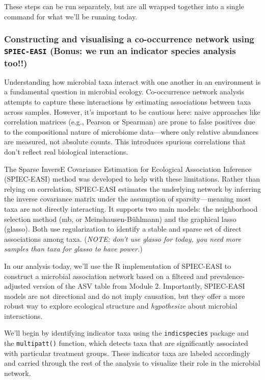 \documentclass[
]{book}
\begin{document}
These steps can be run separately, but are all wrapped together into a single command for what we'll be running today.

\subsubsection{\texorpdfstring{Constructing and visualising a co-occurrence network using \texttt{SPIEC-EASI} (Bonus: we run an indicator species analysis too!!)}{Constructing and visualising a co-occurrence network using SPIEC-EASI (Bonus: we run an indicator species analysis too!!)}}\label{constructing-and-visualising-a-co-occurrence-network-using-spiec-easi-bonus-we-run-an-indicator-species-analysis-too}

Understanding how microbial taxa interact with one another in an environment is a fundamental question in microbial ecology. Co-occurrence network analysis attempts to capture these interactions by estimating associations between taxa across samples. However, it's important to be cautious here: naive approaches like correlation matrices (e.g., Pearson or Spearman) are prone to false positives due to the compositional nature of microbiome data---where only relative abundances are measured, not absolute counts. This introduces spurious correlations that don't reflect real biological interactions.

The Sparse InversE Covariance Estimation for Ecological Association Inference (SPIEC-EASI) method was developed to help with these limitations. Rather than relying on correlation, SPIEC-EASI estimates the underlying network by inferring the inverse covariance matrix under the assumption of sparsity---meaning most taxa are not directly interacting. It supports two main models: the neighborhood selection method (mb, or Meinshausen-Bühlmann) and the graphical lasso (glasso). Both use regularization to identify a stable and sparse set of direct associations among taxa. (\emph{NOTE: don't use glasso for today, you need more samples than taxa for glasso to have power.})

In our analysis today, we'll use the R implementation of SPIEC-EASI to construct a microbial association network based on a filtered and prevalence-adjusted version of the ASV table from Module 2. Importantly, SPIEC-EASI models are not directional and do not imply causation, but they offer a more robust way to explore ecological structure and \emph{hypothesize} about microbial interactions.

We'll begin by identifying indicator taxa using the \texttt{indicspecies} package and the \texttt{multipatt()} function, which detects taxa that are significantly associated with particular treatment groups. These indicator taxa are labeled accordingly and carried through the rest of the analysis to visualize their role in the microbial network.
\end{document}
